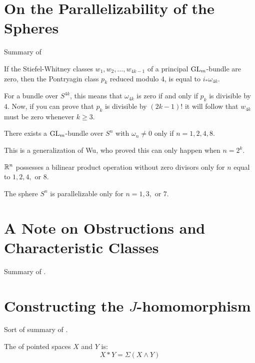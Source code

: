 \chapter{On the Parallelizability of the Spheres}

Summary of \cite{bott1958parallelizability}

\begin{lemma}
	If the Stiefel-Whitney classes $w_1, w_2, \ldots, w_{4k-1}$ of a principal $\operatorname{GL}_m$-bundle are zero, then the Pontryagin class $p_k$ reduced modulo $4$, is equal to $i_* \omega_{4k}$.
\end{lemma}

For a bundle over $S^{4k}$, this means that $\omega_{4k}$ is zero if and only if $p_k$ is divisible by $4$. Now, if you can prove that $p_k$ is divisible by $(2k-1)!$ it will follow that $w_{4k}$ must be zero whenever $k\geq 3$.

\begin{theorem}
	There exists a $\operatorname{GL}_m$-bundle over $S^n$ with $\omega_n\neq 0$ only if $n = 1,2,4,8$.
\end{theorem}

This is a generalization of Wu, who proved this can only happen when $n=2^k$.

\begin{corollary}
	$\mathbb{R}^n$ possesses a bilinear product operation without zero divisors only for $n$ equal to $1,2,4,$ or $8$.
\end{corollary}

\begin{corollary}
	The sphere $S^n$ is parallelizable only for $n=1,3,$ or $7$.
\end{corollary}

\chapter{A Note on Obstructions and Characteristic Classes}

Summary of \cite{kervaire1959}.

\chapter{Constructing the \texorpdfstring{$J$}{J}-homomorphism}

Sort of summary of \cite{whitehead1942}.

\begin{definition}
 The  of pointed spaces $X$ and $Y$ is:
 \[X * Y = \Sigma(X\wedge Y)\]
\end{definition}

